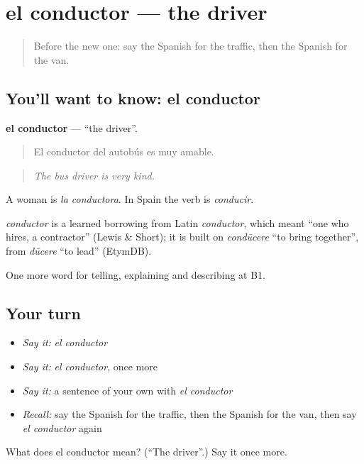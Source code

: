 \section[el conductor]{el conductor — the driver}

\label{lesson:ES-C640-conductor}



\begin{quote}
Before the new one: say the Spanish for the traffic, then the Spanish for the van.
\end{quote}

\subsection*{You'll want to know: el conductor}
\textbf{el conductor} — \textquotedblleft{}the driver\textquotedblright{}.

\begin{quote}
El conductor del autobús es muy amable.
\end{quote}

\begin{quote}
\emph{The bus driver is very kind.}
\end{quote}

A woman is \emph{la conductora}. In Spain the verb is \emph{conducir}.

\begin{cousinweb}
\emph{conductor} is a learned borrowing from Latin \emph{conductor}, which meant \textquotedblleft{}one who hires, a contractor\textquotedblright{} (Lewis \& Short); it is built on \emph{condūcere} \textquotedblleft{}to bring together\textquotedblright{}, from \emph{dūcere} \textquotedblleft{}to lead\textquotedblright{} (EtymDB).
\end{cousinweb}

\begin{grammarlens}[title={What you've built}]
One more word for telling, explaining and describing at B1.
\end{grammarlens}

\subsection*{Your turn}
\begin{itemize}
\raggedright
  \item \emph{Say it:} \emph{el conductor}
  \item \emph{Say it:} \emph{el conductor}, once more
  \item \emph{Say it:} a sentence of your own with \emph{el conductor}
  \item \emph{Recall:} say the Spanish for the traffic, then the Spanish for the van, then say \emph{el conductor} again
\end{itemize}

\begin{tcolorbox}[breakable,colback=teal!4,colframe=teal!35!black,title={Before you move on}]
What does el conductor mean? (\textquotedblleft{}The driver\textquotedblright{}.) Say it once more.
\end{tcolorbox}
